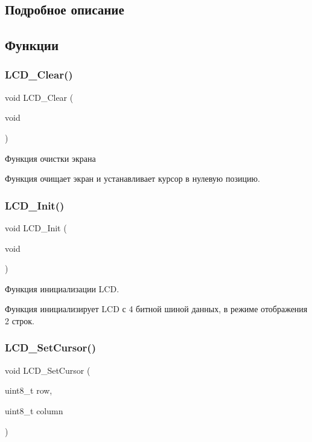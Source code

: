 \subsection{Подробное описание}


\subsection{Функции}
\mbox{\label{group___l_c_d_gae60d0b62d7eb3fa31266c095d7b3c245}} 
\subsubsection{\texorpdfstring{L\+C\+D\+\_\+\+Clear()}{LCD\_Clear()}}
{\footnotesize\ttfamily void L\+C\+D\+\_\+\+Clear (\begin{DoxyParamCaption}\item[{void}]{ }\end{DoxyParamCaption})}



Функция очистки экрана 

Функция очищает экран и устанавливает курсор в нулевую позицию. \mbox{\label{group___l_c_d_gaa53c9d40f3aa552a9974cd55ac510cb3}} 
\subsubsection{\texorpdfstring{L\+C\+D\+\_\+\+Init()}{LCD\_Init()}}
{\footnotesize\ttfamily void L\+C\+D\+\_\+\+Init (\begin{DoxyParamCaption}\item[{void}]{ }\end{DoxyParamCaption})}



Функция инициализации L\+CD. 

Функция инициализирует L\+CD с 4 битной шиной данных, в режиме отображения 2 строк. \mbox{\label{group___l_c_d_ga9cb99b2bea272c3cf14ddd5679481398}} 
\subsubsection{\texorpdfstring{L\+C\+D\+\_\+\+Set\+Cursor()}{LCD\_SetCursor()}}
{\footnotesize\ttfamily void L\+C\+D\+\_\+\+Set\+Cursor (\begin{DoxyParamCaption}\item[{uint8\+\_\+t}]{row,  }\item[{uint8\+\_\+t}]{column }\end{DoxyParamCaption})}



